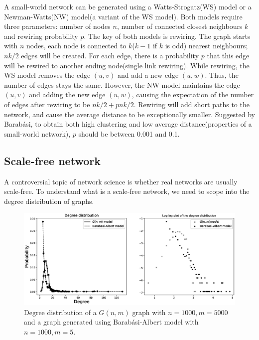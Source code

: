 \documentclass[12pt]{article}
\begin{document}
A small-world network can be generated using a Watts-Strogatz(WS) model\cite{wsmodel} or a Newman-Watts(NW) model(a variant of the WS model)\cite{nwmodel}. Both models require three parameters: number of nodes $n$, number of connected closest neighbours $k$ and rewiring probability $p$. The key of both models is rewiring. The graph starts with $n$ nodes, each node is connected to $k$($k-1$ if $k$ is odd) nearest neighbours; $nk/2$ edges will be created. For each edge, there is a probability $p$ that this edge will be rewired to another ending node(single link rewiring). While rewiring, the WS model removes the edge $(u,v)$ and add a new edge $(u,w)$. Thus, the number of edges stays the same. However, the NW model maintains the edge $(u,v)$ and adding the new edge $(u,w)$, causing the expectation of the number of edges after rewiring to be $nk/2+pnk/2$. Rewiring will add short paths to the network, and cause the average distance to be exceptionally smaller. Suggested by Barabási\cite{barabási2016network}, to obtain both high clustering and low average distance(properties of a small-world network), $p$ should be between 0.001 and 0.1.\\


\subsection{Scale-free network}
A controversial topic of network science is whether
real networks are usually scale-free\cite{holme2019rare}. To understand what is a scale-free network, we need to scope into the degree distribution of graphs.\\

\begin{figure}[ht]
    \centering
    \includegraphics[width=\textwidth]{degree_distribution.eps}
    \centering
    \caption{Degree distribution of a $G(n,m)$ graph with $n=1000,m=5000$ and a graph generated using Barabási-Albert model with $n=1000,m=5$.}
    \label{fig:degree_dist}
\end{figure}
\end{document}
